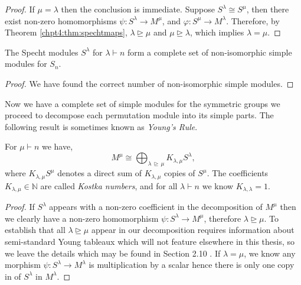 \documentclass[11pt]{report}
\begin{document}
\begin{proof}
	If $\mu =\lambda$ then the conclusion is immediate. Suppose $S^{\lambda} \cong S^{\mu}$, then there exist non-zero homomorphisms $\psi: S^{\lambda} \to M^{\mu}$, and $\varphi:S^{\mu} \to M^{\lambda}$. Therefore, by Theorem \ref{chpt4:thm:spechtmaps}, $\lambda \trianglerighteq \mu$ and $\mu \trianglerighteq \lambda$, which implies $\lambda = \mu$.
\end{proof}




\begin{corollary}
	The Specht modules $S^{\lambda}$ for $\lambda\vdash n$ form a complete 
	set of non-isomorphic simple modules for $S_{n}$. 
\end{corollary}

\begin{proof}
	We have found the correct number of non-isomorphic simple modules.
\end{proof}



Now we have a complete set of simple modules for the symmetric groups we proceed to  decompose each permutation module into its simple parts. The following result is sometimes known as \emph{Young's Rule}.








\begin{lemma}
	\label{chpt4:lem:youngrule}
	For $\mu \vdash n$ we have,
	\[M^{\mu} \cong \bigoplus_{\lambda \,\trianglerighteq  \,\mu} 
	K_{\lambda,\mu} S^{\lambda},\]
	where $K_{\lambda,\mu}S^\mu$ denotes a direct 
	sum of $K_{\lambda,\mu}$ copies of $S^\mu$.
	The coefficients $K_{\lambda,\mu} \in \mathbb{N}$ are called \emph{Kostka 
		numbers}, and for 
	all $\lambda \vdash n$ we know $K_{\lambda,\lambda} = 1$.
\end{lemma}

\begin{proof}
	If $S^{\lambda}$ appears with a non-zero coefficient in the decomposition of $M^{\mu}$ then we clearly have a non-zero homomorphism $\psi:S^{\lambda} \to M^{\mu}$, therefore $\lambda \trianglerighteq \mu$. To establish that all $\lambda \trianglerighteq \mu$ appear in our decomposition requires information about semi-standard Young tableaux which will not feature elsewhere in this thesis, so we leave the details which may be found in Section 2.10 \cite{sagan2013symmetric}.	If $\lambda=\mu$, we know any morphism $\psi:S^{\lambda} \to M^{\lambda}$ is multiplication by a scalar hence there is only one copy in of $S^{\lambda}$ in $M^{\lambda}$.
\end{proof}
\end{document}
